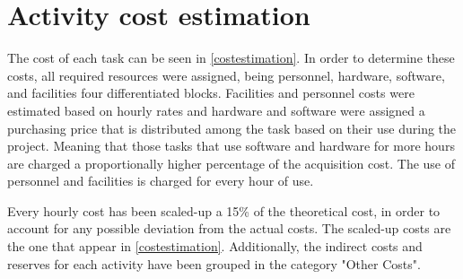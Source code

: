 \section{Activity cost estimation}
The cost of each task can be seen in \ref{costestimation}. In order to determine these costs, all required resources were assigned, being personnel, hardware, software, and facilities four differentiated blocks. Facilities and personnel costs were estimated based on hourly rates and hardware and software were assigned a purchasing price that is distributed among the task based on their use during the project. Meaning that those tasks that use software and hardware for more hours are charged a proportionally higher percentage of the acquisition cost. The use of personnel and facilities is charged for every hour of use.

Every hourly cost has been scaled-up a 15\% of the theoretical cost, in order to account for any possible deviation from the actual costs. The scaled-up costs are the one that appear in \ref{costestimation}. Additionally, the indirect costs and reserves for each activity have been grouped in the category "Other Costs".